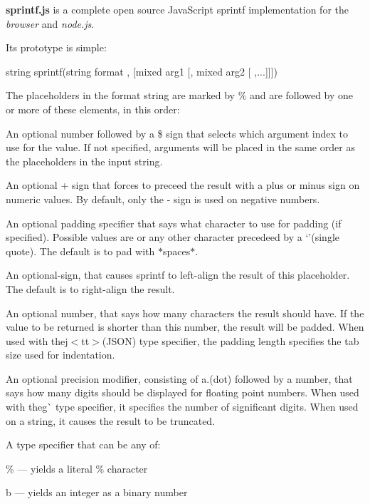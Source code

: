 {\bfseries sprintf.\+js} is a complete open source Java\+Script sprintf implementation for the {\itshape browser} and {\itshape node.\+js}.

Its prototype is simple\+: \begin{DoxyVerb}string sprintf(string format , [mixed arg1 [, mixed arg2 [ ,...]]])
\end{DoxyVerb}


The placeholders in the format string are marked by {\ttfamily \%} and are followed by one or more of these elements, in this order\+:


\begin{DoxyItemize}
\item An optional number followed by a {\ttfamily \$} sign that selects which argument index to use for the value. If not specified, arguments will be placed in the same order as the placeholders in the input string.
\item An optional {\ttfamily +} sign that forces to preceed the result with a plus or minus sign on numeric values. By default, only the {\ttfamily -\/} sign is used on negative numbers.
\item An optional padding specifier that says what character to use for padding (if specified). Possible values are {} or any other character precedeed by a `'{\ttfamily (single quote). The default is to pad with $\ast$spaces$\ast$.}
\item {\ttfamily An optional}-\/{\ttfamily sign, that causes sprintf to left-\/align the result of this placeholder. The default is to right-\/align the result.}
\item {\ttfamily An optional number, that says how many characters the result should have. If the value to be returned is shorter than this number, the result will be padded. When used with the}j$<$tt$>$(\+J\+S\+O\+N) type specifier, the padding length specifies the tab size used for indentation.
\item An optional precision modifier, consisting of a.{\ttfamily (dot) followed by a number, that says how many digits should be displayed for floating point numbers. When used with the}g\`{} type specifier, it specifies the number of significant digits. When used on a string, it causes the result to be truncated.
\item A type specifier that can be any of\+:
\begin{DoxyItemize}
\item {\ttfamily \%} — yields a literal {\ttfamily \%} character
\item {\ttfamily b} — yields an integer as a binary number

\end{DoxyItemize}
\end{DoxyItemize}
